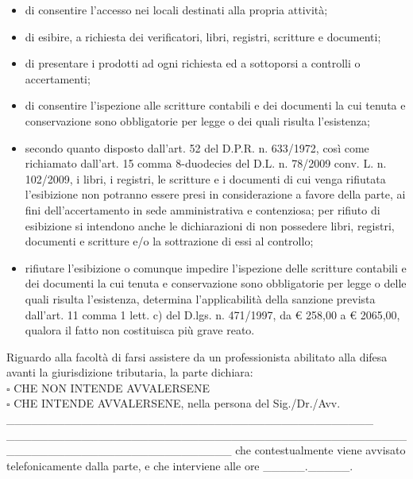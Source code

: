 \documentclass[12pt]{article}
\begin{document}
\begin{itemize}
    \item di consentire l’accesso nei locali destinati alla propria attività;
    \item di esibire, a richiesta dei verificatori, libri, registri, scritture e documenti;
    \item di presentare i prodotti ad ogni richiesta ed a sottoporsi a controlli o accertamenti;
    \item di consentire l’ispezione alle scritture contabili e dei documenti la cui tenuta e conservazione sono obbligatorie per legge o dei quali risulta l’esistenza;
    \item secondo quanto disposto dall’art. 52 del D.P.R. n. 633/1972, così come richiamato dall’art. 15 comma 8-duodecies del D.L. n. 78/2009 conv. L. n. 102/2009, i libri, i registri, le scritture e i documenti di cui venga rifiutata l’esibizione non potranno essere presi in considerazione a favore della parte, ai fini dell’accertamento in sede amministrativa e contenziosa; per rifiuto di esibizione si intendono anche le dichiarazioni di non possedere libri, registri, documenti e scritture e/o la sottrazione di essi al controllo;
    \item rifiutare l’esibizione o comunque impedire l’ispezione delle scritture contabili e dei documenti la cui tenuta e conservazione sono obbligatorie per legge o delle quali risulta l’esistenza, determina l’applicabilità della sanzione prevista dall’art. 11 comma 1 lett. c) del D.lgs. n. 471/1997, da € 258,00 a € 2065,00, qualora il fatto non costituisca più grave reato.
\end{itemize}
Riguardo alla facoltà di farsi assistere da un professionista abilitato alla difesa avanti la giurisdizione tributaria, la parte dichiara:
\\ \begin{math}\square\end{math} CHE NON INTENDE AVVALERSENE
\\ \begin{math}\square\end{math} CHE INTENDE AVVALERSENE, nella persona del Sig./Dr./Avv. \_\_\_\_\_\_\_\_\_\_\_\_\_\_\_\_\_\_\_\_\_\_\_\_\_\_\_\_\_\_\_\_\_\_\_\_\_\_\_\_\_\_\_\_ \\\_\_\_\_\_\_\_\_\_\_\_\_\_\_\_\_\_\_\_\_\_\_\_\_\_\_\_\_\_\_\_\_\_\_\_\_\_\_\_\_\_\_\_\_\_\_\_\_\_\_\_\_\_\_\_\_\_\_\_\_\_\_\_\_\_\_\_\_\_\_\_\_\_\_\_ che contestualmente viene avvisato telefonicamente dalla parte, e che interviene alle ore \_\_\_\_\_.\_\_\_\_\_.
\end{document}
